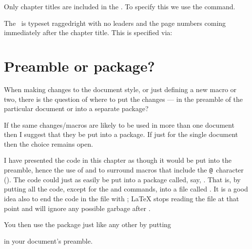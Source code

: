     Only chapter titles are included in the \toc. To specify this we
use the \cmd{\settocdepth} command.
\begin{lcode}
\end{lcode}

    The \toc\ is typeset raggedright with no leaders and the page numbers 
coming immediately after the chapter title. This is specified via:
\begin{lcode}
\renewcommand{\cftchapterfont}{\normalfont}
\renewcommand{\cftchapterpagefont}{\normalfont}
\renewcommand{\cftchapterpresnum}{\bfseries}
\renewcommand{\cftchapterleader}{}
\renewcommand{\cftchapterafterpnum}{\cftparfillskip}
\end{lcode}

\section{Preamble or package?}


    When making changes to the document style, or just defining a new
macro or two, there is the question of where to put the changes --- in
the preamble of the particular document or into a separate 
package?

    If the same changes/macros are likely to be used in more than one
document then I suggest that they be put into a package. 
If just for the single document then the choice remains open.

    I have presented the code in this chapter as though it would be  put
into the preamble, hence the use of \cmd{\makeatletter} and 
\cmd{\makeatother} to surround macros that include the 
\texttt{@}\idxatincode\ character (\seeatincode). The
code could just as easily be put into a package called, say, 
. That is, by putting all the code, except for the
\cmd{\makeatletter} and \cmd{\makeatother} commands, into a file called
. It is a good idea also to end the code in the file
with \cmd{\endinput}; LaTeX stops reading the file at that point and 
will ignore any possible garbage after \cmd{\endinput}.

    You then use the  package just like any other by
putting
\begin{lcode}
\usepackage{bringhurst}
\end{lcode}
in your document's preamble.

